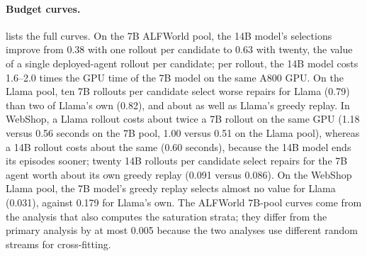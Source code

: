 \documentclass{article}
\theoremstyle{plain}
\theoremstyle{definition}
\theoremstyle{remark}
\begin{document}
\paragraph{Budget curves.}
 lists the full curves. On the 7B ALFWorld pool, the 14B model's selections improve from 0.38 with one rollout per candidate to 0.63 with twenty, the value of a single deployed-agent rollout per candidate; per rollout, the 14B model costs 1.6--2.0 times the GPU time of the 7B model on the same A800 GPU. On the Llama pool, ten 7B rollouts per candidate select worse repairs for Llama (0.79) than two of Llama's own (0.82), and about as well as Llama's greedy replay. In WebShop, a Llama rollout costs about twice a 7B rollout on the same GPU (1.18 versus 0.56 seconds on the 7B pool, 1.00 versus 0.51 on the Llama pool), whereas a 14B rollout costs about the same (0.60 seconds), because the 14B model ends its episodes sooner; twenty 14B rollouts per candidate select repairs for the 7B agent worth about its own greedy replay (0.091 versus 0.086). On the WebShop Llama pool, the 7B model's greedy replay selects almost no value for Llama (0.031), against 0.179 for Llama's own. The ALFWorld 7B-pool curves come from the analysis that also computes the saturation strata; they differ from the primary analysis by at most 0.005 because the two analyses use different random streams for cross-fitting.

\begin{table}[!htbp]
  \caption{Reversal checks on the unscreened 7B pool (only fresh rollouts; 30 per branch and executor). $\Delta_e=R_e(r_a)-R_e(r_b)$ with $R_e$ the net gain of \cref{eq:netgain}, where $r_a$ is the deployed 7B agent's best candidate and $r_b$ the other executor's in the earlier rollouts; difference $=\Delta_{\mathrm{7B}}-\Delta_{\mathrm{other}}$. Control: trajectories where both executors' best candidate was $r_a$, with $r_b$ the 7B agent's second best. Sig.\ opposite / aligned: both $\Delta$s have 90\% intervals excluding 0, with opposite / equal signs.}
  \label{tab:reversal}
  \centering
  \footnotesize
  \setlength{\tabcolsep}{3pt}
\end{table}
\end{document}
